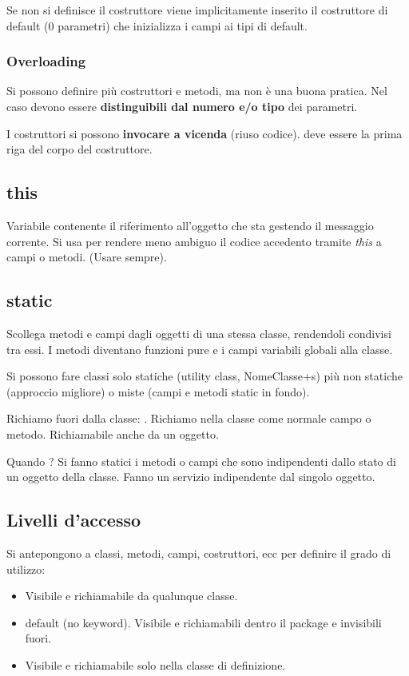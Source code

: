 
Se non si definisce il costruttore viene implicitamente inserito il costruttore di default (0 parametri) che inizializza i campi ai tipi di default.

\subsubsection{Overloading}
Si possono definire più costruttori e metodi, ma non è una buona pratica.
Nel caso devono essere \textbf{distinguibili dal numero e/o tipo} dei parametri.

I costruttori si possono \textbf{invocare a vicenda} (riuso codice).  deve essere la prima riga del corpo del costruttore.


\subsection{this}
Variabile contenente il riferimento all'oggetto che sta gestendo il messaggio corrente. Si usa per rendere meno ambiguo il codice accedento tramite \textit{this} a campi o metodi. (Usare sempre).

\subsection{static}
Scollega metodi e campi dagli oggetti di una stessa classe, rendendoli condivisi tra essi. I metodi diventano funzioni pure e i campi variabili globali alla classe.

Si possono fare classi solo statiche (utility class, NomeClasse+s) più non statiche (approccio migliore) o miste (campi e metodi static in fondo).

Richiamo fuori dalla classe: .
Richiamo nella classe come normale campo o metodo.
Richiamabile anche da un oggetto.


Quando ?
Si fanno statici i metodi o campi che sono indipendenti dallo stato di un oggetto della classe. Fanno un servizio indipendente dal singolo oggetto.

\subsection{Livelli d'accesso}
Si antepongono a classi, metodi, campi, costruttori, ecc per definire il grado di utilizzo:
\begin{itemize}
	\item {} Visibile e richiamabile da qualunque classe.
	\item {} default (no keyword). Visibile e richiamabili dentro il package e invisibili fuori.
	\item {} Visibile e richiamabile solo nella classe di definizione.
\end{itemize}

